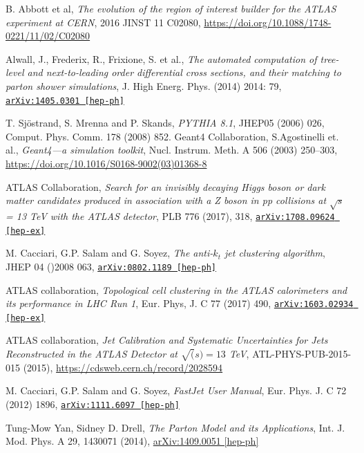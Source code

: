 \documentclass[11pt,a4paper,openright,twoside]{report}
\newcommand{\bibref}[4]{#1, \textit{#2}, #3 #4}
\begin{document}
\begin{thebibliography}{9}
	\bibref{B. Abbott et al}{The evolution of the region of interest builder for the ATLAS experiment at CERN}{2016 JINST 11 C02080,}{\url{https://doi.org/10.1088/1748-0221/11/02/C02080}}

	\bibref{Alwall, J., Frederix, R., Frixione, S. et al.}{The automated computation of tree-level and next-to-leading order differential cross sections, and their matching to parton shower simulations}{J. High Energ. Phys. (2014) 2014: 79,}{\href{https://arxiv.org/abs/1405.0301}{\texttt{arXiv:1405.0301 [hep-ph]}}}

	\bibref{T. Sjöstrand, S. Mrenna and P. Skands}{PYTHIA 8.1}{JHEP05 (2006) 026, Comput. Phys. Comm. 178 (2008) 852.}

	\bibref{Geant4 Collaboration, S.Agostinelli et. al.}{Geant4—a simulation toolkit}{Nucl. Instrum. Meth. A 506 (2003) 250–303,}{\url{https://doi.org/10.1016/S0168-9002(03)01368-8}}

	\bibref{ATLAS Collaboration}{Search for an invisibly decaying Higgs boson or dark matter candidates produced in association with a Z boson in pp collisions at $\sqrt{s}$ = 13 TeV with the ATLAS detector}{PLB 776 (2017), 318,}{\href{https://arxiv.org/abs/1708.09624}{\texttt{arXiv:1708.09624 [hep-ex]}}}
	
	\bibref{M. Cacciari, G.P. Salam and G. Soyez}{The anti-$k_t$ jet clustering algorithm}{JHEP 04 ()2008 063,}{\href{https://arxiv.org/abs/0802.1189}{\texttt{arXiv:0802.1189 [hep-ph]}}}
	
	\bibref{ATLAS collaboration}{Topological cell clustering in the ATLAS calorimeters and its performance in LHC Run 1}{Eur. Phys, J. C 77 (2017) 490,}{\href{https://arxiv.org/abs/1603.02934}{\texttt{arXiv:1603.02934 [hep-ex]}}}
	
	\bibref{ATLAS collaboration}{Jet Calibration and Systematic Uncertainties for Jets Reconstructed in the ATLAS Detector at $\sqrt(s)=13$ TeV}{ATL-PHYS-PUB-2015-015 (2015),}{\url{https://cdsweb.cern.ch/record/2028594}}
	
	\bibref{M. Cacciari, G.P. Salam and G. Soyez}{FastJet User Manual}{Eur. Phys. J. C 72 (2012) 1896,}{\href{https://arxiv.org/abs/1111.6097}{\texttt{arXiv:1111.6097 [hep-ph]}}}
	
	\bibref{Tung-Mow Yan, Sidney D. Drell}{The Parton Model and its Applications}{Int. J. Mod. Phys. A 29, 1430071 (2014),}{\href{https://arxiv.org/abs/1409.0051}{arXiv:1409.0051 [hep-ph]}}
	

\end{thebibliography}
\end{document}
